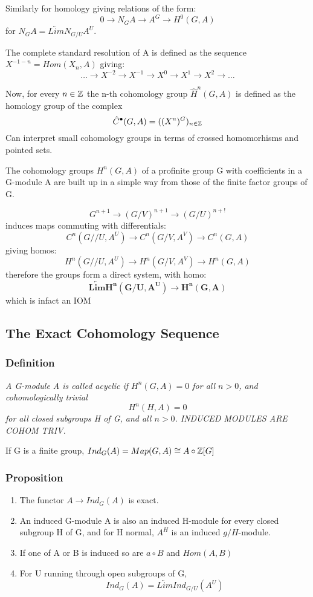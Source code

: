 Similarly for homology giving relations of the form:
$$0\rightarrow N_G A \rightarrow A^G \rightarrow  H^0(G,A)$$ for $N_G A = \underleftarrow{Lim} N_{G/U} A^U$.

The complete standard resolution of A is defined as the sequence $X^{-1-n} = Hom (X_n,A)$ giving:
$$\dots\rightarrow X^{-2}\rightarrow X^{-1}\rightarrow X^0\rightarrow X^1\rightarrow X^2\rightarrow\dots$$

Now, for every $n\in \mathbb Z$ the n-th cohomology group $\hat H^n (G,A)$ is defined as the homology group of the complex
$$\hat C^\bullet (G,A) = ((X^n)^G)_{n\in \mathbb Z}$$
Can interpret small cohomology groups in terms of crossed homomorhisms and pointed sets.

The cohomology groups $H^n(G,A)$ of a profinite group G with coefficients in a G-module A are built up in a simple way from those of the finite factor groups of G.

$$G^{n+1}\rightarrow (G/V)^{n+1}\rightarrow (G/U)^{n+!}$$ induces maps commuting with differentials:
$$C^n(G//U,A^U)\rightarrow C^n(G/V, A^V)\rightarrow C^n(G,A)$$ giving homos:
$$H^n(G//U,A^U)\rightarrow H^n(G/V, A^V)\rightarrow H^n(G,A)$$therefore the groups form a direct system, with homo:
$$\mathbf{\underleftarrow {Lim} H^n (G/U , A^U) \rightarrow H^n (G,A)}$$
which is infact an IOM




\subsection{The Exact Cohomology Sequence}
\subsubsection{Definition}
\emph{A G-module A is called acyclic if $H^n(G,A) =0$ for all $n>0$, and cohomologically trivial $$H^n(H,A) =0$$ for all closed subgroups H of G, and all $n>0$. INDUCED MODULES ARE COHOM TRIV.}

If G is a finite group, $Ind_G(A) = Map(G,A) \cong A\circ \mathbb Z [G]$

\subsubsection{Proposition}\begin{enumerate}
\item The functor $A\rightarrow Ind_G(A)$ is exact.
\item An induced G-module A is also an induced H-module for every closed subgroup H of G, and for H normal, $A^H$ is an induced $g/H$-module.
\item If one of A or B is induced so are $a\circ B$ and $Hom(A,B)$
\item For U running through open subgroups of G,
$$Ind_G(A) = \underleftarrow{Lim} Ind_{G/U} (A^U)$$\end{enumerate}

